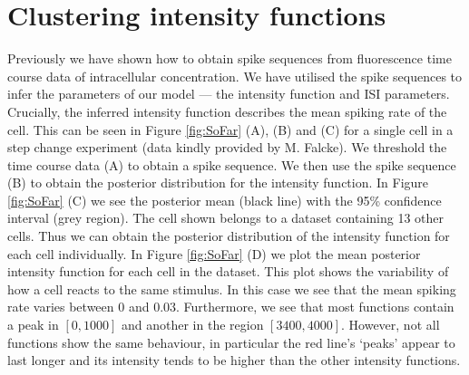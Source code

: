 \documentclass[12pt]{book} %
\begin{document}
%
\chapter{Clustering intensity functions}
Previously we have shown how to obtain  spike sequences from fluorescence time course data of intracellular  concentration. We have utilised the  spike sequences to infer the parameters of our model --- the intensity function and ISI parameters. Crucially, the inferred intensity function describes the mean spiking rate of the cell. This can be seen in Figure \ref{fig:SoFar} (A), (B) and (C) for a single cell in a step change experiment (data kindly provided by M. Falcke). We threshold the time course data (A) to obtain a  spike sequence. We then use the  spike sequence (B) to obtain the posterior distribution for the intensity function. In Figure \ref{fig:SoFar} (C) we see the posterior mean (black line) with the 95\% confidence interval (grey region). The cell shown belongs to a dataset containing 13 other cells. Thus we can obtain the posterior distribution of the intensity function for each cell individually. In Figure \ref{fig:SoFar} (D) we plot the mean posterior intensity function for each cell in the dataset.  This plot shows the variability of how a cell reacts to the same stimulus. In this case we see that the mean spiking rate varies between $0$ and $0.03$. Furthermore, we see that most functions contain a peak in $[0,1000]$ and another in the region $[3400,4000]$. However, not all functions show the same behaviour, in particular the red line's `peaks' appear to last longer and its intensity tends to be higher than the other intensity functions.
\end{document}
